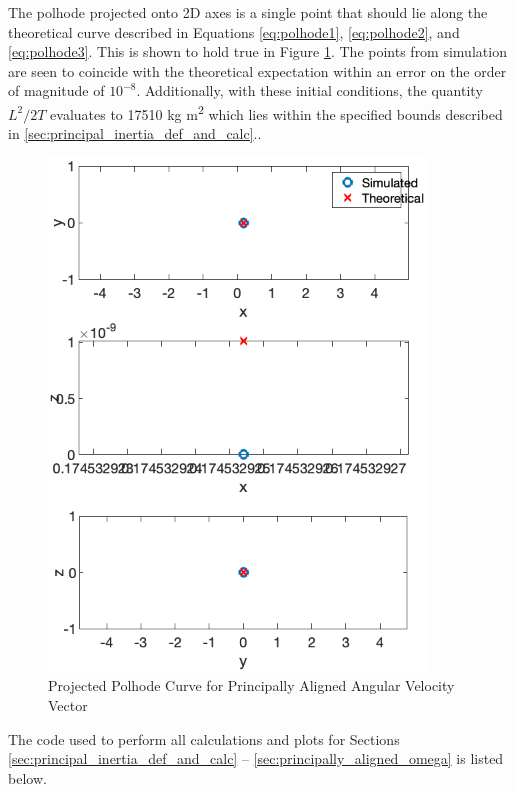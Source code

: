 The polhode projected onto 2D axes is a single point that should lie along the theoretical curve described in Equations \ref{eq:polhode1}, \ref{eq:polhode2}, and \ref{eq:polhode3}. This is shown to hold true in Figure \ref{fig:2d_polhode_principal}. The points from simulation are seen to coincide with the theoretical expectation within an error on the order of magnitude of $10^{-8}$. Additionally, with these initial conditions, the quantity $L^2/2T$ evaluates to 17510 kg m\textsuperscript{2} which lies within the specified bounds described in \ref{sec:principal_inertia_def_and_calc}..

\begin{figure}[H]
    \centering
    \includegraphics[width = 10cm]{Images/planar_polhode_principal.png}
    \caption{Projected Polhode Curve for Principally Aligned Angular Velocity Vector}
    \label{fig:2d_polhode_principal}
\end{figure}

The code used to perform all calculations and plots for Sections \ref{sec:principal_inertia_def_and_calc} -- \ref{sec:principally_aligned_omega} is listed below.

